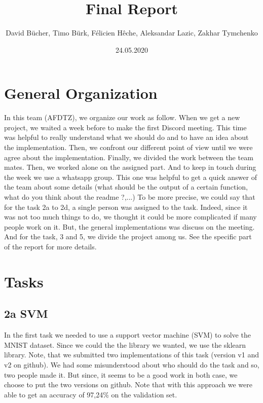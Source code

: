 \documentclass[12pt]{article}
\begin{document}
\title{Final Report}
\author{David Bücher, Timo Bürk, Félicien Hêche, Aleksandar Lazic, Zakhar Tymchenko }
\date{24.05.2020}
\maketitle


\section*{General Organization}
In this team (AFDTZ), we organize our work as follow.
\newline When we get a new project, we waited a week before to make the first Discord meeting. This time was helpful to really understand what we should do and to have an idea about the implementation. Then, we confront our different point of view until we were agree about the implementation. Finally, we divided the work between the team mates. 
\newline Then, we worked alone on the assigned part. And to keep in touch during the week we use a whatsapp group. This one was helpful to get a quick answer of the team about some details (what should be the output of a certain function, what do you think about the readme ?,...)
\newline  To be more precise, we could say that for the task 2a to 2d, a single person was assigned to the task. Indeed, since it was not too much things to do, we thought it could be more complicated if many people work on it. But, the general implementations was discuss on the meeting. And for the task, 3 and 5, we divide the project among us. See the specific part of the report for more details. 
\section*{Tasks}
\subsection*{2a SVM}
In the first task we needed to use a support vector machine (SVM) to solve the MNIST dataset. Since we could the the library we wanted, we use the sklearn library. Note, that we submitted two implementations of this task (version v1 and v2 on github). We had some misunderstood about who should do the task and so, two people made it. But since, it seems to be a good work in both case, we choose to put the two versions on github. Note that with this approach we were able to get an accuracy of 97,24\% on the validation set.
\end{document}

